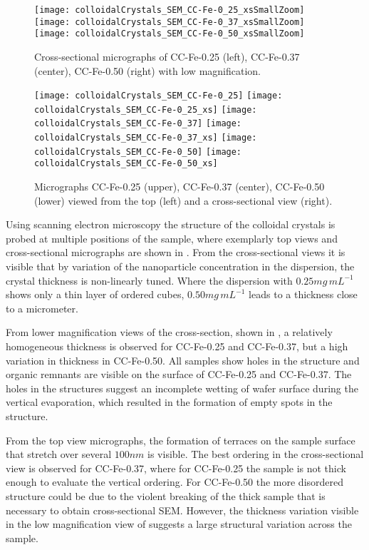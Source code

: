 \documentclass[\main/dresen_thesis.tex]{subfiles}
\begin{document}
  \label{sec:colloidalCrystals:layers:sem}

  \begin{figure}[tb]
    \centering
    \texttt{[image: colloidalCrystals\_SEM\_CC-Fe-0\_25\_xsSmallZoom]}
    \texttt{[image: colloidalCrystals\_SEM\_CC-Fe-0\_37\_xsSmallZoom]}
    \texttt{[image: colloidalCrystals\_SEM\_CC-Fe-0\_50\_xsSmallZoom]}
    \caption{\label{fig:colloidalCrystals:structure:semLowMag}Cross-sectional micrographs of CC-Fe-0.25 (left), CC-Fe-0.37 (center), CC-Fe-0.50 (right) with low magnification.}
  \end{figure}

  \begin{figure}[tb]
    \centering
    \texttt{[image: colloidalCrystals\_SEM\_CC-Fe-0\_25]}
    \texttt{[image: colloidalCrystals\_SEM\_CC-Fe-0\_25\_xs]}
    \texttt{[image: colloidalCrystals\_SEM\_CC-Fe-0\_37]}
    \texttt{[image: colloidalCrystals\_SEM\_CC-Fe-0\_37\_xs]}
    \texttt{[image: colloidalCrystals\_SEM\_CC-Fe-0\_50]}
    \texttt{[image: colloidalCrystals\_SEM\_CC-Fe-0\_50\_xs]}
    \caption{\label{fig:colloidalCrystals:structure:sem}Micrographs CC-Fe-0.25 (upper), CC-Fe-0.37 (center), CC-Fe-0.50 (lower) viewed from the top (left) and a cross-sectional view (right). }
  \end{figure}
  Using scanning electron microscopy the structure of the colloidal crystals is probed at multiple positions of the sample, where exemplarly top views and cross-sectional micrographs are shown in .
  From the cross-sectional views it is visible that by variation of the nanoparticle concentration in the dispersion, the crystal thickness is non-linearly tuned.
  Where the dispersion with $0.25 \unit{mg \, mL^{-1}}$ shows only a thin layer of ordered cubes, $0.50 \unit{mg \, mL^{-1}}$ leads to a thickness close to a micrometer.

  From lower magnification views of the cross-section, shown in , a relatively homogeneous thickness is observed for CC-Fe-0.25 and CC-Fe-0.37, but a high variation in thickness in CC-Fe-0.50.
  All samples show holes in the structure and organic remnants are visible on the surface of CC-Fe-0.25 and CC-Fe-0.37.
  The holes in the structures suggest an incomplete wetting of wafer surface during the vertical evaporation, which resulted in the formation of empty spots in the structure.

  From the top view micrographs, the formation of terraces on the sample surface that stretch over several $100 \unit{nm}$ is visible.
  The best ordering in the cross-sectional view is observed for CC-Fe-0.37, where for CC-Fe-0.25 the sample is not thick enough to evaluate the vertical ordering.
  For CC-Fe-0.50 the more disordered structure could be due to the violent breaking of the thick sample that is necessary to obtain cross-sectional SEM.
  However, the thickness variation visible in the low magnification view of  suggests a large structural variation across the sample.
\end{document}
